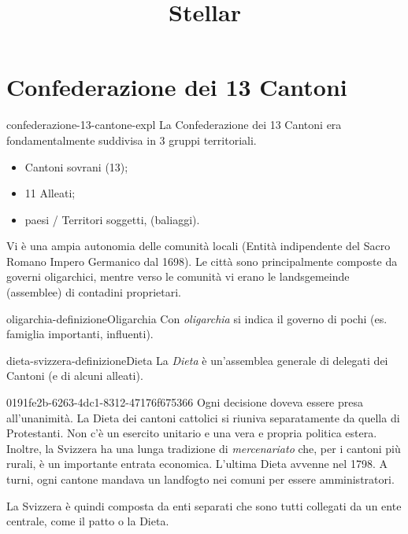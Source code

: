 \documentclass[preview]{standalone}
\begin{document}
\title{Stellar}
\genpage

\section{Confederazione dei 13 Cantoni}

\begin{snippet}{confederazione-13-cantone-expl}
    La Confederazione dei 13 Cantoni era fondamentalmente suddivisa in 3 gruppi territoriali.
    \begin{itemize}
        \item Cantoni sovrani (13);
        \item 11 Alleati;
        \item paesi / Territori soggetti, (baliaggi).
    \end{itemize}

    Vi è una ampia autonomia delle comunità locali (Entità indipendente del Sacro Romano Impero Germanico dal 1698).
    Le città sono principalmente composte da governi oligarchici, mentre verso le comunità
    vi erano le landsgemeinde (assemblee) di contadini proprietari.
\end{snippet}

\begin{snippetdefinition}{oligarchia-definizione}{Oligarchia}
    Con \textit{oligarchia} si indica il governo di pochi (es. famiglia importanti, influenti).
\end{snippetdefinition}


\begin{snippetdefinition}{dieta-svizzera-definizione}{Dieta}
    La \textit{Dieta} è un'assemblea generale di delegati dei Cantoni (e di alcuni alleati).
\end{snippetdefinition}

\begin{snippet}{0191fe2b-6263-4dc1-8312-47176f675366}
    Ogni decisione doveva essere presa all'unanimità.
    La Dieta dei cantoni cattolici si riuniva separatamente da quella di Protestanti.
    Non c'è un esercito unitario e una vera e propria politica estera.
    Inoltre, la Svizzera ha una lunga tradizione di \textit{mercenariato} che, per i cantoni più rurali,
    è un importante entrata economica.
    L'ultima Dieta avvenne nel 1798.
    A turni, ogni cantone mandava un landfogto nei comuni per essere amministratori.
    
    La Svizzera è quindi composta da enti separati che sono tutti collegati da un ente centrale, come il patto o la Dieta.
\end{snippet}
\end{document}
